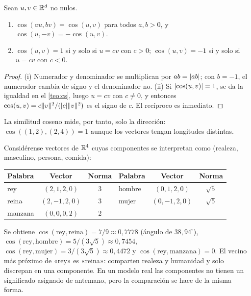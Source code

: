 \begin{proposicion}\label{prop:coseno}
Sean $u,v\in\mathbb{R}^{d}$ no nulos.
\begin{enumerate}
  \item $\cos(au,bv)=\cos(u,v)$ para todos $a,b>0$, y $\cos(u,-v)=-\cos(u,v)$.
  \item $\cos(u,v)=1$ si y solo si $u=cv$ con $c>0$; $\cos(u,v)=-1$ si y solo si $u=cv$ con $c<0$.
\end{enumerate}
\end{proposicion}

\begin{proof}
(i) Numerador y denominador se multiplican por $ab=\lvert ab\rvert$; con $b=-1$, el numerador cambia de signo y el denominador no. (ii) Si $\lvert\cos(u,v)\rvert=1$, se da la igualdad en el \cref{teo:cs}, luego $u=cv$ con $c\neq 0$, y entonces $\cos(u,v)=c\lVert v\rVert^{2}/(\lvert c\rvert\lVert v\rVert^{2})$ es el signo de $c$. El recíproco es inmediato.
\end{proof}

La similitud coseno mide, por tanto, solo la dirección: $\cos((1,2),(2,4))=1$ aunque los vectores tengan longitudes distintas.

\begin{ejemplo}\label{ej:juguete}
Considérense vectores de $\mathbb{R}^{4}$ cuyas componentes se interpretan como (realeza, masculino, persona, comida):
\begin{center}\small
\begin{tabular}{@{}lcc@{\qquad}lcc@{}}
\toprule
Palabra & Vector & Norma & Palabra & Vector & Norma \\
\midrule
rey & $(2,1,2,0)$ & $3$ & hombre & $(0,1,2,0)$ & $\sqrt5$ \\
reina & $(2,-1,2,0)$ & $3$ & mujer & $(0,-1,2,0)$ & $\sqrt5$ \\
manzana & $(0,0,0,2)$ & $2$ & & & \\
\bottomrule
\end{tabular}
\end{center}
Se obtiene $\cos(\text{rey},\text{reina})=7/9\approx 0{,}7778$ (ángulo de $38{,}94^\circ$), $\cos(\text{rey},\text{hombre})=5/(3\sqrt5)\approx 0{,}7454$, $\cos(\text{rey},\text{mujer})=3/(3\sqrt5)\approx 0{,}4472$ y $\cos(\text{rey},\text{manzana})=0$. El vecino más próximo de «rey» es «reina»: comparten realeza y humanidad y solo discrepan en una componente. En un modelo real las componentes no tienen un significado asignado de antemano, pero la comparación se hace de la misma forma.
\end{ejemplo}


